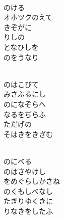 \documentclass[10pt,b5j]{tarticle} %
\begin{document}
\vspace{1.5em} %
\newcommand{\linespace}{0.5em} %
\newcommand{\blocksize}{0.5\hsize} %
\newcommand{\itemmargin}{3em} %
\begin{enumerate} %
    \setlength{\itemindent}{\itemmargin} %
    \begin{minipage}[c]{\blocksize}
    
        \vspace{\linespace}
        \item~\\
        のける\\
        オホツクのえて\\
        きぞがに\\
        りしの\\
        となひしを\\
        のをうなり
        
    \end{minipage}
    \begin{minipage}[c]{\blocksize}
        
        \vspace{\linespace}
        \item~\\
        のはこびて\\
        みさぶるにし\\
        のになぞらへ\\
        なるをぢらふ\\
        ただげの\\
        そはきをきざむ
        
    \end{minipage}
    \begin{minipage}[c]{\blocksize}
        
        \vspace{\linespace}
        \item~\\
        のにべる\\
        のはさやけし\\
        をめぐらしかさね\\
        のくもしべなし\\
        たぎりゆくきに\\
        りなきをしたふ
        

\end{minipage}
\end{enumerate}
\end{document}
